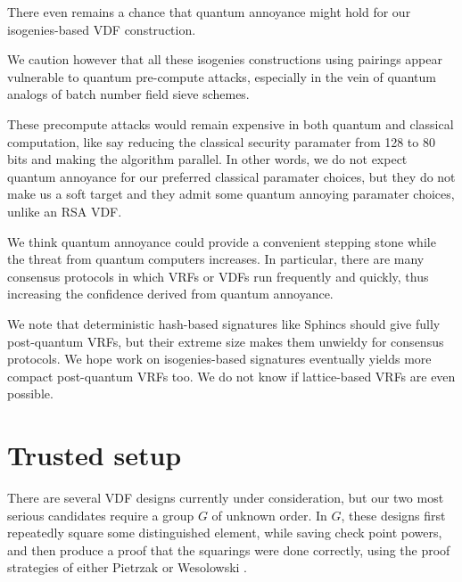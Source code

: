 \documentclass{article}
\begin{document}
There even remains a chance that quantum annoyance might hold for
our isogenies-based VDF construction.

We caution however that all these isogenies constructions using
pairings appear vulnerable to quantum pre-compute attacks, especially
in the vein of quantum analogs of batch number field sieve schemes.  

These precompute attacks would remain expensive in both quantum and
classical computation, like say reducing the classical security
paramater from 128 to 80 bits and making the algorithm parallel. 
In other words, we do not expect quantum annoyance for our preferred
classical paramater choices, but they do not make us a soft target
and they admit some quantum annoying paramater choices, 
unlike an RSA VDF.

We think quantum annoyance could provide a convenient stepping stone
while the threat from quantum computers increases.  In particular,
there are many consensus protocols in which VRFs or VDFs run frequently
and quickly, thus increasing the confidence derived from quantum annoyance.  

We note that deterministic hash-based signatures like Sphincs should
give fully post-quantum VRFs, but their extreme size makes them
unwieldy for consensus protocols.  We hope work on isogenies-based
signatures eventually yields more compact post-quantum VRFs too.
We do not know if lattice-based VRFs are even possible.


\section{Trusted setup}

There are several VDF designs currently under consideration, but
our two most serious candidates require a group $G$ of unknown order.
In $G$, these designs first repeatedly square some distinguished
element, while saving check point powers, and then produce a proof
that the squarings were done correctly, using the proof strategies
of either Pietrzak \cite{Pietrzak} or Wesolowski \cite{Wesolowski}.
\end{document}
